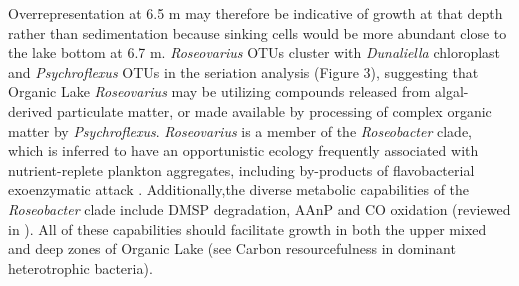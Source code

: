{{Overrepresentation at 6.5 m may therefore be indicative of growth at that depth rather than sedimentation because sinking cells would be more abundant close to the lake bottom at 6.7 m. 
\emph{Roseovarius} \acp{OTU} cluster with \emph{Dunaliella} chloroplast and \emph{Psychroflexus} \acp{OTU} in the seriation analysis (Figure 3), suggesting that Organic Lake \emph{Roseovarius} may be utilizing compounds released from algal-derived particulate matter, or made available by processing of complex organic matter by \emph{Psychroflexus}.
\emph{Roseovarius} is a member of the \emph{Roseobacter} clade, which is inferred to have an opportunistic ecology frequently associated with nutrient-replete plankton aggregates, including by-products of flavobacterial exoenzymatic attack \cite{Moran2007, Teeling2012}. 
Additionally,the diverse metabolic capabilities of the \emph{Roseobacter} clade include \ac{DMSP} degradation, \ac{AAnP} and CO oxidation (reviewed in \citet{Wagner-Dobler2006}). 
All of these capabilities should facilitate growth in both the upper mixed and deep zones of Organic Lake (see Carbon resourcefulness in dominant heterotrophic bacteria).%

}}
